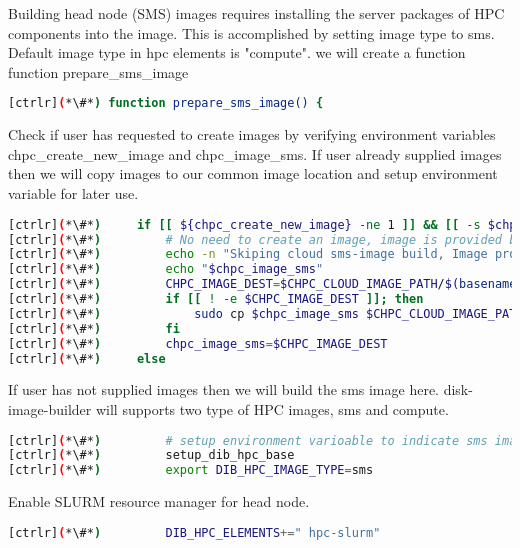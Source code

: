 	Building head node (SMS) images requires installing the server packages of HPC components into the image. This is accomplished by setting image type to sms. Default image type in hpc elements is "compute". we will create a function function prepare\_sms\_image

\begin{lstlisting}[language=bash,keywords={}]
[ctrlr](*\#*) function prepare_sms_image() {
\end{lstlisting} 

	Check if user has requested to create images by verifying environment variables chpc\_create\_new\_image and chpc\_image\_sms. If user already supplied images then we will copy images to our common image location and setup environment variable for later use.
	
\begin{lstlisting}[language=bash,keywords={}]
[ctrlr](*\#*)     if [[ ${chpc_create_new_image} -ne 1 ]] && [[ -s $chpc_image_sms ]]; then
[ctrlr](*\#*)         # No need to create an image, image is provided by user
[ctrlr](*\#*)         echo -n "Skiping cloud sms-image build, Image provided:"
[ctrlr](*\#*)         echo "$chpc_image_sms"
[ctrlr](*\#*)         CHPC_IMAGE_DEST=$CHPC_CLOUD_IMAGE_PATH/$(basename $chpc_image_sms)
[ctrlr](*\#*)         if [[ ! -e $CHPC_IMAGE_DEST ]]; then
[ctrlr](*\#*)             sudo cp $chpc_image_sms $CHPC_CLOUD_IMAGE_PATH
[ctrlr](*\#*)         fi
[ctrlr](*\#*)         chpc_image_sms=$CHPC_IMAGE_DEST
[ctrlr](*\#*)     else
\end{lstlisting} 

	If user has not supplied images then we will build the sms image here. disk-image-builder will supports two type of HPC images, sms and compute.  

\begin{lstlisting}[language=bash,keywords={}]
[ctrlr](*\#*)         # setup environment varioable to indicate sms image type
[ctrlr](*\#*)         setup_dib_hpc_base
[ctrlr](*\#*)         export DIB_HPC_IMAGE_TYPE=sms
\end{lstlisting} 

	Enable SLURM resource manager for head node.


\begin{lstlisting}[language=bash,keywords={}]
[ctrlr](*\#*)         DIB_HPC_ELEMENTS+=" hpc-slurm"
\end{lstlisting} 


